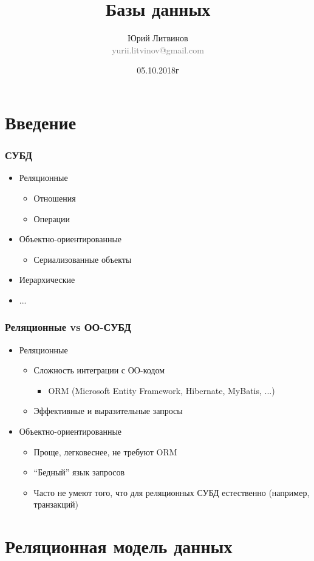 \documentclass[xetex,mathserif,serif]{beamer}
\title{Базы данных}
\author[Юрий Литвинов]{Юрий Литвинов\\\small{\textcolor{gray}{yurii.litvinov@gmail.com}}}
\date{05.10.2018г}
\begin{document}
	\frame{\titlepage}

	\section{Введение}

	\begin{frame}
		\frametitle{СУБД}
		\begin{itemize}
			\item Реляционные
			\begin{itemize}
				\item Отношения
				\item Операции
			\end{itemize}
			\item Объектно-ориентированные
			\begin{itemize}
				\item Сериализованные объекты
			\end{itemize}
			\item Иерархические
			\item ...
		\end{itemize}
	\end{frame}

	\begin{frame}
		\frametitle{Реляционные vs ОО-СУБД}
		\begin{itemize}
			\item Реляционные
			\begin{itemize}
				\item Сложность интеграции с ОО-кодом
				\begin{itemize}
					\item ORM (Microsoft Entity Framework, Hibernate, MyBatis, ...)
				\end{itemize}
				\item Эффективные и выразительные запросы
			\end{itemize}
			\item Объектно-ориентированные
			\begin{itemize}
				\item Проще, легковеснее, не требуют ORM
				\item ``Бедный'' язык запросов
				\item Часто не умеют того, что для реляционных СУБД естественно (например, транзакций)
			\end{itemize}
		\end{itemize}
	\end{frame}

	\section{Реляционная модель данных}
\end{document}
